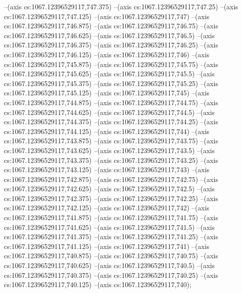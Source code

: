 --(axis cs:1067.12396529117,747.375)
--(axis cs:1067.12396529117,747.25)
--(axis cs:1067.12396529117,747.125)
--(axis cs:1067.12396529117,747)
--(axis cs:1067.12396529117,746.875)
--(axis cs:1067.12396529117,746.75)
--(axis cs:1067.12396529117,746.625)
--(axis cs:1067.12396529117,746.5)
--(axis cs:1067.12396529117,746.375)
--(axis cs:1067.12396529117,746.25)
--(axis cs:1067.12396529117,746.125)
--(axis cs:1067.12396529117,746)
--(axis cs:1067.12396529117,745.875)
--(axis cs:1067.12396529117,745.75)
--(axis cs:1067.12396529117,745.625)
--(axis cs:1067.12396529117,745.5)
--(axis cs:1067.12396529117,745.375)
--(axis cs:1067.12396529117,745.25)
--(axis cs:1067.12396529117,745.125)
--(axis cs:1067.12396529117,745)
--(axis cs:1067.12396529117,744.875)
--(axis cs:1067.12396529117,744.75)
--(axis cs:1067.12396529117,744.625)
--(axis cs:1067.12396529117,744.5)
--(axis cs:1067.12396529117,744.375)
--(axis cs:1067.12396529117,744.25)
--(axis cs:1067.12396529117,744.125)
--(axis cs:1067.12396529117,744)
--(axis cs:1067.12396529117,743.875)
--(axis cs:1067.12396529117,743.75)
--(axis cs:1067.12396529117,743.625)
--(axis cs:1067.12396529117,743.5)
--(axis cs:1067.12396529117,743.375)
--(axis cs:1067.12396529117,743.25)
--(axis cs:1067.12396529117,743.125)
--(axis cs:1067.12396529117,743)
--(axis cs:1067.12396529117,742.875)
--(axis cs:1067.12396529117,742.75)
--(axis cs:1067.12396529117,742.625)
--(axis cs:1067.12396529117,742.5)
--(axis cs:1067.12396529117,742.375)
--(axis cs:1067.12396529117,742.25)
--(axis cs:1067.12396529117,742.125)
--(axis cs:1067.12396529117,742)
--(axis cs:1067.12396529117,741.875)
--(axis cs:1067.12396529117,741.75)
--(axis cs:1067.12396529117,741.625)
--(axis cs:1067.12396529117,741.5)
--(axis cs:1067.12396529117,741.375)
--(axis cs:1067.12396529117,741.25)
--(axis cs:1067.12396529117,741.125)
--(axis cs:1067.12396529117,741)
--(axis cs:1067.12396529117,740.875)
--(axis cs:1067.12396529117,740.75)
--(axis cs:1067.12396529117,740.625)
--(axis cs:1067.12396529117,740.5)
--(axis cs:1067.12396529117,740.375)
--(axis cs:1067.12396529117,740.25)
--(axis cs:1067.12396529117,740.125)
--(axis cs:1067.12396529117,740);

